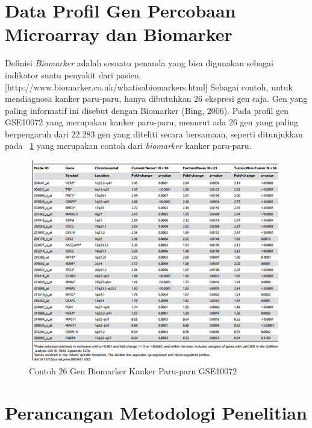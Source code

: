 \section{Data Profil Gen Percobaan Microarray dan Biomarker}

Definisi \textit{Biomarker} adalah sesuatu penanda yang bisa digunakan sebagai indikator suatu penyakit dari pasien. [http://www.biomarker.co.uk/whatisabiomarkers.html] Sebagai contoh, untuk mendiagnosa kanker paru-paru, hanya dibutuhkan 26 ekspresi gen saja. Gen yang paling informatif ini disebut dengan Biomarker (Bing, 2006). Pada profil gen GSE10072 yang merupakan kanker paru-paru, menurut  \citep{belinsky2004gene} ada 26 gen yang paling berpengaruh dari 22.283 gen yang diteliti secara bersamaan, seperti ditunjukkan pada \pic~\ref{fig:biomarker} yang merupakan contoh dari \textit{biomarker} kanker paru-paru.

\begin{figure}
	\centering
	\includegraphics[width=1\textwidth]
		{pics/biomarker.png}
	\caption{Contoh 26 Gen Biomarker Kanker Paru-paru GSE10072 \citep{landi2008gene}}
	\label{fig:biomarker}
\end{figure}


\section{Perancangan Metodologi Penelitian}

